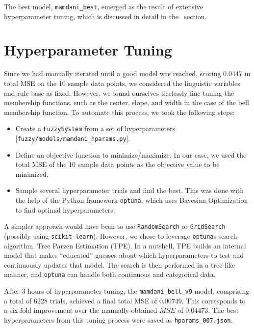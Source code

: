 \documentclass[11pt]{report}
\newcommand*\apos{\textsc{\char13}}
\begin{document}
The best model, \texttt{mamdani\_best}, emerged as the result of extensive hyperparameter tuning, which is discussed in detail in the~ section.



\section{Hyperparameter Tuning}
\label{sec:hyper_tuning}

Since we had manually iterated until a good model was reached, scoring 0.0447 in total MSE on the 10 sample data points, we considered the linguistic variables and rule base as fixed.
However, we found ourselves tirelessly fine-tuning the membership functions, such as the center, slope, and width in the case of the bell membership function.
To automate this process, we took the following steps:

\begin{itemize}
    \item Create a \texttt{FuzzySystem} from a set of hyperparameters [\texttt{fuzzy/models/mamdani\_hparams.py}].
    \item Define an objective function to minimize/maximize.
          In our case, we used the total MSE of the 10 sample data points as the objective value to be minimized.
    \item Sample several hyperparameter trials and find the best.
          This was done with the help of the Python framework \texttt{optuna}, which uses Bayesian Optimization to find optimal hyperparameters.
\end{itemize}

A simpler approach would have been to use \texttt{RandomSearch} or \texttt{GridSearch} (possibly using \texttt{scikit-learn}).
However, we chose to leverage \texttt{optuna}\apos s search algorithm, Tree Parzen Estimation (TPE).
In a nutshell, TPE builds an internal model that makes ``educated'' guesses about which hyperparameters to test and continuously updates that model.
The search is then performed in a tree-like manner, and \texttt{optuna} can handle both continuous and categorical data.

After 3 hours of hyperparameter tuning, the \texttt{mamdani\_bell\_v9} model, comprising a total of 6228 trials, achieved a final total MSE of $0.00749$.
This corresponds to a six-fold improvement over the manually obtained $MSE$ of $0.04473$.
The best hyperparameters from this tuning process were saved as \texttt{hparams\_007.json}.
\end{document}
